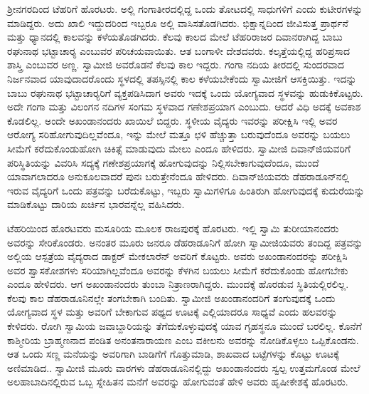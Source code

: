 ಶ‍್ರೀನಗರದಿಂದ ಟೆಹರಿಗೆ ಹೊರಟರು. ಅಲ್ಲಿ ಗಂಗಾತೀರದಲ್ಲಿದ್ದ ಒಂದು ತೋಟದಲ್ಲಿ ಸಾಧುಗಳಿಗೆ ಎಂದು ಕುಟೀರಗಳನ್ನು ಮಾಡಿದ್ದರು. ಅದು ಖಾಲಿ ಇದ್ದುದರಿಂದ ಇಬ್ಬರೂ ಅಲ್ಲಿ ವಾಸಿಸತೊಡಗಿದರು. ಭಿಕ್ಷಾನ್ನದಿಂದ ಜೀವಿಸುತ್ತ ಪ್ರಾರ್ಥನೆ ಮತ್ತು ಧ್ಯಾನದಲ್ಲಿ ಕಾಲವನ್ನು ಕಳೆಯತೊಡಗಿದರು. ಕೆಲವು ಕಾಲದ ಮೇಲೆ ಟೆಹರಿರಾಜರ ದಿವಾನರಾಗಿದ್ದ ಬಾಬು ರಘುನಾಥ ಭಟ್ಟಾಚಾರ‍್ಯ ಎಂಬುವರ ಪರಿಚಯವಾಯಿತು. ಆತ ಬಂಗಾಳೀ ದೇಶದವರು. ಕಲ್ಕತ್ತೆಯಲ್ಲಿದ್ದ ಹರಿಪ್ರಸಾದ ಶಾಸ್ತ್ರಿ ಎಂಬುವರ ಅಣ್ಣ. ಸ್ವಾಮೀಜಿ ಅವರೊಡನೆ ಕೆಲವು ಕಾಲ ಇದ್ದರು. ಗಂಗಾ ನದಿಯ ತೀರದಲ್ಲಿ ಸುಂದರವಾದ ನಿರ್ಜನವಾದ ಯಾವುದಾದರೊಂದು ಸ್ಥಳದಲ್ಲಿ ತಪಸ್ಸಿನಲ್ಲಿ ಕಾಲ ಕಳೆಯಬೇಕೆಂದು ಸ್ವಾಮೀಜಿಗೆ ಆಸಕ್ತಿಯಿತ್ತು. ಇದನ್ನು ಬಾಬು ರಘುನಾಥ ಭಟ್ಟಾಚಾರ‍್ಯರಿಗೆ ವ್ಯಕ್ತಪಡಿಸಿದಾಗ ಅವರು ಇದಕ್ಕೆ ಒಂದು ಯೋಗ್ಯವಾದ ಸ್ಥಳವನ್ನು ಹುಡುಕಿಕೊಟ್ಟರು. ಅದೇ ಗಂಗಾ ಮತ್ತು ವಿಲಂಗನ ನದಿಗಳ ಸಂಗಮ ಸ್ಥಳವಾದ ಗಣೇಶಪ್ರಯಾಗ ಎಂಬುದು. ಆದರೆ ವಿಧಿ ಅದಕ್ಕೆ ಅವಕಾಶ ಕೊಡಲಿಲ್ಲ. ಅಂದೇ ಅಖಂಡಾನಂದರು ಖಾಯಿಲೆ ಬಿದ್ದರು. ಸ್ಥಳೀಯ ವೈದ್ಯರು ಇವರನ್ನು ಪರೀಕ್ಷಿಸಿ ಇಲ್ಲಿ ಅವರ ಆರೋಗ್ಯ ಸರಿಹೋಗುವುದಿಲ್ಲವೆಂದೂ, ಇನ್ನು ಮೇಲೆ ಮತ್ತೂ ಛಳಿ ಹೆಚ್ಚುತ್ತಾ ಬರುವುದೆಂದೂ ಅವರನ್ನು ಬಯಲು ಸೀಮೆಗೆ ಕರೆದುಕೊಂಡುಹೋಗಿ ಚಿಕಿತ್ಸೆ ಮಾಡುವುದು ಮೇಲು ಎಂದೂ ಹೇಳಿದರು. ಸ್ವಾಮೀಜಿ ದಿವಾನ್‍ಜಿಯವರಿಗೆ ಪರಿಸ್ಥಿತಿಯನ್ನು ವಿವರಿಸಿ ಸದ್ಯಕ್ಕೆ ಗಣೇಶಪ್ರಯಾಗಕ್ಕೆ ಹೋಗುವುದನ್ನು ನಿಲ್ಲಿಸಬೇಕಾಗುವುದೆಂದೂ, ಮುಂದೆ ಯಾವಾಗಲಾದರೂ ಅನುಕೂಲವಾದರೆ ಪುನಃ ಬರುತ್ತೇನೆಂದೂ ಹೇಳಿದರು. ದಿವಾನ್‍ಜಿಯವರು ಡೆಹರಾಡೂನ್‍ನಲ್ಲಿ ಇರುವ ವೈದ್ಯರಿಗೆ ಒಂದು ಪತ್ರವನ್ನು ಬರೆದುಕೊಟ್ಟು, ಇಬ್ಬರು ಸ್ವಾಮಿಗಳಿಗೂ ಹಿಂತಿರುಗಿ ಹೋಗುವುದಕ್ಕೆ ಕುದುರೆಯನ್ನು ಮಾಡಿಕೊಟ್ಟು ದಾರಿಯ ಖರ್ಚಿನ ಭಾರವನ್ನೆಲ್ಲ ವಹಿಸಿದರು. 

ಟೆಹರಿಯಿಂದ ಹೊರಟವರು ಮಸೂರಿಯ ಮೂಲಕ ರಾಜಪುರಕ್ಕೆ ಹೊರಟರು. ಇಲ್ಲಿ ಸ್ವಾಮಿ ತುರೀಯಾನಂದರು ಅವರನ್ನು ಸೇರಿಕೊಂಡರು. ಅನಂತರ ಮೂರು ಜನರೂ ಡೆಹರಾಡೂನಿಗೆ ಹೋಗಿ ಸ್ವಾಮೀಜಿಯವರು ತಂದಿದ್ದ ಪತ್ರವನ್ನು ಅಲ್ಲಿಯ ಆಸ್ಪತ್ರೆಯ ವೈದ್ಯರಾದ ಡಾಕ್ಟರ್ ಮೇಕಲಾರೆನ್ ಅವರಿಗೆ ಕೊಟ್ಟರು. ಅವರು ಅಖಂಡಾನಂದರನ್ನು ಪರೀಕ್ಷಿಸಿ ಅವರ ಶ್ವಾಸಕೋಶಗಳು ಸರಿಯಾಗಿಲ್ಲವೆಂದೂ ಅವರನ್ನು ಕೆಳಗಿನ ಬಯಲು ಸೀಮೆಗೆ ಕರೆದುಕೊಂಡು ಹೋಗಬೇಕು ಎಂದೂ ಹೇಳಿದರು. ಆಗ ಅಖಂಡಾನಂದರು ತುಂಬಾ ನಿತ್ರಾಣರಾಗಿದ್ದರು. ಮುಂದಕ್ಕೆ ಹೊರಡುವ ಸ್ಥಿತಿಯಲ್ಲಿರಲಿಲ್ಲ. ಕೆಲವು ಕಾಲ ಡೆಹರಾಡೂನಿನಲ್ಲೇ ತಂಗಬೇಕಾಗಿ ಬಂದಿತು. ಸ್ವಾಮೀಜಿ ಅಖಂಡಾನಂದರಿಗೆ ತಂಗುವುದಕ್ಕೆ ಒಂದು ಯೋಗ್ಯವಾದ ಸ್ಥಳ ಮತ್ತು ಅವರಿಗೆ ಬೇಕಾಗುವ ಪಥ್ಯದ ಊಟಕ್ಕೆ ಎಲ್ಲಿಯಾದರೂ ಸಾಧ್ಯವೆ ಎಂದು ಹಲವರನ್ನು ಕೇಳಿದರು. ರೋಗಿ ಸ್ವಾಮಿಯ ಜವಾಬ್ದಾರಿಯನ್ನು ತೆಗೆದುಕೊಳ್ಳುವುದಕ್ಕೆ ಯಾವ ಗೃಹಸ್ಥನೂ ಮುಂದೆ ಬರಲಿಲ್ಲ. ಕೊನೆಗೆ ಕಾಶ್ಮೀರಿಯ ಬ್ರಾಹ್ಮಣನಾದ ಪಂಡಿತ ಅನಂತನಾರಾಯಣ ಎಂಬ ವಕೀಲನು ಅವರನ್ನು ನೋಡಿಕೊಳ್ಳಲು ಒಪ್ಪಿಕೊಂಡನು. ಆತ ಒಂದು ಸಣ್ಣ ಮನೆಯನ್ನು ಅವರಿಗಾಗಿ ಬಾಡಿಗೆಗೆ ಗೊತ್ತುಮಾಡಿ, ಶಾಖವಾದ ಬಟ್ಟೆಗಳನ್ನು ಕೊಟ್ಟು ಊಟಕ್ಕೆ ಅಣಿಮಾಡಿದ.. ಸ್ವಾಮೀಜಿ ಮೂರು ವಾರಗಳು ಡೆಹರಾಡೂನಿನಲ್ಲಿದ್ದು ಅಖಂಡಾನಂದರು ಸ್ವಲ್ಪ ಉತ್ತಮಗೊಂಡ ಮೇಲೆ ಅಲಹಾಬಾದಿನಲ್ಲಿರುವ ಒಬ್ಬ ಸ್ನೇಹಿತನ ಮನೆಗೆ ಅವರನ್ನು ಹೋಗುವಂತೆ ಹೇಳಿ ಅವರು ಹೃಷೀಕೇಶಕ್ಕೆ ಹೊರಟರು. 

